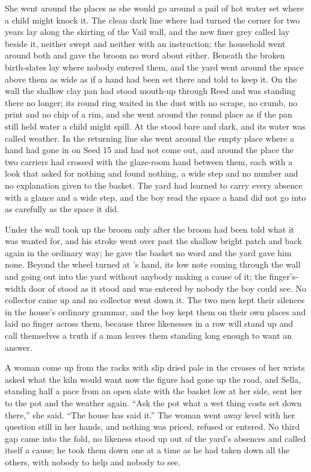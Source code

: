 She went around the places as she would go around a pail of hot water set where a child might knock it. The clean dark line where  had turned the corner for two years lay along the skirting of the Vail wall, and the new finer grey called  lay beside it, neither swept and neither with an instruction; the household went around both and gave the broom no word about either. Beneath  the broken birth-slates lay where nobody entered them, and the yard went around the space above them as wide as if a hand had been set there and told to keep it. On the wall the shallow clay pan had stood mouth-up through Reed and was standing there no longer; its round ring waited in the dust with no scrape, no crumb, no print and no chip of a rim, and she went around the round place as if the pan still held water a child might spill. At  the  stood bare and dark, and its water was called weather. In the returning line she went around the empty place where a hand had gone in on Seed 15 and had not come out, and around the place the two carriers had crossed with the glaze-room hand between them, each with a look that asked for nothing and found nothing, a wide step and no number and no explanation given to the basket. The yard had learned to carry every absence with a glance and a wide step, and the boy read the space a hand did not go into as carefully as the space it did.

Under the wall  took up the broom only after the broom had been told what it was wanted for, and his stroke went over  past the shallow bright patch and back again in the ordinary way; he gave the basket no word and the yard gave him none. Beyond  the wheel turned at 's hand, its low note coming through the wall and going out into the yard without anybody making a cause of it; the finger's-width door of  stood as it stood and was entered by nobody the boy could see. No collector came up  and no collector went down it. The two men kept their silences in the house's ordinary grammar, and the boy kept them on their own places and laid no finger across them, because three likenesses in a row will stand up and call themselves a truth if a man leaves them standing long enough to want an answer.

A woman come up from the racks with slip dried pale in the creases of her wrists asked what the kiln would want now the figure had gone up the road, and Sella, standing half a pace from an open slate with the basket low at her side, sent her to the pot and the weather again. “Ask the pot what a wet thing costs set down there,” she said. “The house has said it.” The woman went away level with her question still in her hands, and nothing was priced, refused or entered. No third gap came into the fold, no likeness stood up out of the yard's absences and called itself a cause; he took them down one at a time as he had taken down all the others, with nobody to help and nobody to see.

